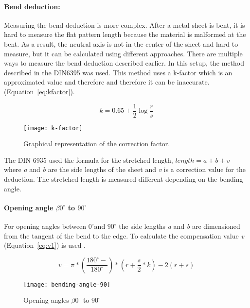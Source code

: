 \paragraph{Bend deduction:}
Measuring the bend deduction is more complex. After a metal sheet is bent, it is hard to measure the flat pattern length because the material is malformed at the bent. 
As a result, the neutral axis is not in the center of the sheet and hard to measure, but it can be calculated using different approaches. %
There are multiple ways to measure the bend deduction described earlier. 
In this setup, the method described in the DIN6395 was used. This method uses a k-factor which is an approximated value and therefore and therefore it can be inaccurate. (Equation~\ref{eq:kfactor}). %

\begin{equation}\label{eq:kfactor}
    k=0.65+\frac{1}{2}\log{\frac{r}{s}}
\end{equation}

\begin{figure}[ht!] %
	\centering
	\texttt{[image: k-factor]}
	\caption[Graphical representation of the correction factor]{Graphical representation of the correction factor.}
	\label{fig:test1}
\end{figure}

The DIN 6935 used the formula for the stretched length, $length=a+b+v$ where \textit{a} and \textit{b} are the side lengths of the sheet and \textit{v} is a correction value for the deduction. \cite{din6935}
The stretched length is measured different depending on the bending angle.

\paragraph{Opening angle $\beta 0^\circ$ to $90^\circ$} 
For opening angles between $0^\circ$and $90^\circ$ the side lengths \textit{a} and \textit{b} are dimensioned from the tangent of the bend to the edge. 
To calculate the compensation value \textit{v} (Equation~\ref{eq:v1}) is used
\cite{din6935}.

\begin{equation}\label{eq:v1}
        v=\pi*(\frac{180^\circ-}{180^\circ})*(r+\frac{s}{2}*k)-2(r+s)
\end{equation}

\begin{figure}[H]
	\centering
	\texttt{[image: bending-angle-90]}
	\caption[Opening angles $\beta 0^\circ$ to $90^\circ$]{Opening angles $\beta 0^\circ$ to $90^\circ$ \cite{din6935}}
	\label{fig:v1-image}
\end{figure}

